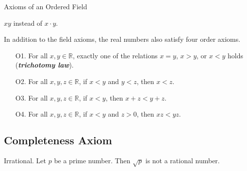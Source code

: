 \documentclass[12pt]{article}
\newcommand\abs[1]{\left|#1\right|}
\newcommand\Real{\mathbb{R}}
\begin{document}
\begin{definition}{Axioms of an Ordered Field}
\begin{remark}
    $xy$ instead of $x \cdot y$.
  \end{remark}
  In addition to the field axioms, the real numbers also satisfy four order
  axioms.
  \begin{itemize}
  \item [O1. ] For all $x,y \in \Real$, exactly one of the relations $x = y$, $x
    > y$, or $x < y$ holds (\textit{\textbf{trichotomy law}}).
  \item [O2. ] For all $x,y,z \in \Real$, if $x < y$ and $y < z$, then $x < z$.
  \item [O3. ] For all $x,y,z \in \Real$, if $x < y$, then $x + z < y + z$.
  \item [O4. ] For all $x,y,z \in \Real$, if $x < y$ and $z > 0$, then $xz <
    yz$.
  \end{itemize}
\end{definition}


\subsection{Completeness Axiom}
\label{sec:org59859b1}
\begin{definition}{Irrational.}
  Let $p$ be a prime number. Then $\sqrt{p}$ is not a rational number.
\end{definition}
\end{document}

